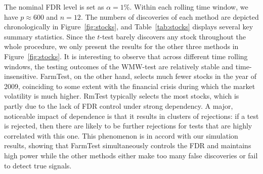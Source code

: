 The nominal FDR level is set as $\alpha=1\%$. Within each rolling time window, we have $p \approx 600$ and $n=12$. The numbers of discoveries of each method are depicted chronologically in Figure~\ref{fig:stocks}, and Table~\ref{tab:stocks} displays several key summary statistics.
Since the $t$-test barely discovers any stock throughout the whole procedure, we only present the results for the other three methods in Figure~\ref{fig:stocks}.
It is interesting to observe that across different time rolling windows, the testing outcomes of the WMW-test are relatively stable and time-insensitive. FarmTest, on the other hand, selects much fewer stocks in the year of 2009, coinciding to some extent with the financial crisis during
which the market volatility is much higher.
RmTest typically selects the most stocks, which is partly due to the lack of FDR control under strong dependency.
A major, noticeable impact of dependence is that it results in clusters of rejections: if a test is rejected, then there are likely to be further rejections for tests that are highly correlated with this one.
This phenomenon is in accord with our simulation results, showing that FarmTest simultaneously controls the FDR and maintains high power while the other methods either make too many false discoveries or fail to detect true signals.

